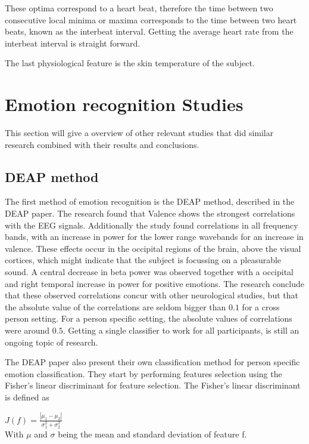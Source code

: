 
\npar

These optima correspond to a heart beat, therefore the time between two consecutive local minima or maxima corresponds to the time between two heart beats, known as the interbeat interval. Getting the average heart rate from the interbeat interval is straight forward.

The last physiological feature is the skin temperature of the subject.

\section{Emotion recognition Studies}
This section will give a overview of other relevant studies that did similar research combined with their results and conclusions.

\subsection{DEAP method}
The first method of emotion recognition is the DEAP method, described in the DEAP paper\citep{DEAP}. The research found that Valence shows the strongest correlations with the EEG signals. Additionally the study found correlations in all frequency bands, with an increase in power for the lower range wavebands for an increase in valence. These effects occur in the occipital regions of the brain, above the visual cortices, which might indicate that the subject is focussing on a pleasurable sound. A central decrease in beta power was observed together with a occipital and right temporal increase in power for positive emotions. The research conclude that these observed correlations concur with other neurological studies, but that the absolute value of the correlations are seldom bigger than $0.1$ for a cross person setting. For a person specific setting, the absolute values of correlations were around $0.5$. Getting a single classifier to work for all participants, is still an ongoing topic of research.

\npar

The DEAP paper also present their own classification method for person specific emotion classification. They start by performing features selection using the Fisher's linear discriminant for feature selection. The Fisher's linear discriminant is defined as

\begin{center}
$J(f) = \frac{|\mu_1 - \mu_2|}{\sigma_1^2 + \sigma_2^2}$ \\
With $\mu$ and $\sigma$ being the mean and standard deviation of feature f.
\end{center}

